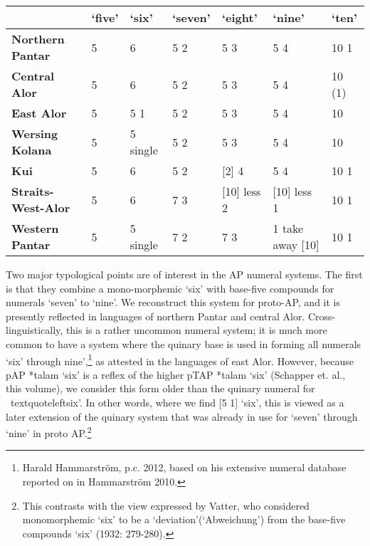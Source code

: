 \begin{center}
\tablehead{}
\begin{supertabular}{m{1.3358599in}m{0.50045985in}m{0.64905983in}m{0.62755984in}m{0.78235984in}m{1.0670599in}m{0.6406598in}}
\hline
 &
\bfseries {\textquoteleft}five{\textquoteright} &
\bfseries {\textquoteleft}six{\textquoteright} &
\bfseries {\textquoteleft}seven{\textquoteright} &
\bfseries {\textquoteleft}eight{\textquoteright} &
\bfseries {\textquoteleft}nine{\textquoteright} &
\bfseries {\textquoteleft}ten{\textquoteright}\\\hline
\bfseries Northern Pantar &
5 &
6 &
5 2 &
5 3 &
5 4 &
10 1\\
\bfseries Central Alor &
5 &
6 &
5 2  &
5 3  &
5 4  &
10 (1)\\
\bfseries East Alor  &
5 &
5 1 &
5 2  &
5 3  &
5 4  &
10\\
\bfseries Wersing Kolana &
5 &
5 single  &
5 2  &
5 3  &
5 4  &
10\\
\bfseries Kui &
5 &
6 &
5 2  &
[2] 4 &
5 4  &
10 1\\
\bfseries Straits-West-Alor &
5 &
6 &
7 3 &
[10] less 2 &
[10] less 1 &
10 1\\
\bfseries Western Pantar &
5 &
5 single  &
7 2 &
7 3 &
1 take away  [10] &
10 1\\\hline
\end{supertabular}
\end{center}
Two major typological points are of interest in the AP numeral systems. The first is that they combine a mono-morphemic {\textquoteleft}six{\textquoteright} with base-five compounds for numerals {\textquoteleft}seven{\textquoteright} to {\textquoteleft}nine{\textquoteright}. We reconstruct this system for proto-AP, and it is presently reflected in languages of northern Pantar and central Alor. Cross-linguistically, this is a rather uncommon numeral system; it is much more common to have a system where the quinary base is used in forming all numerals {\textquoteleft}six{\textquoteright} through nine{\textquoteright},\footnote{Harald Hammarstr\"om, p.c. 2012, based on his extensive numeral database reported on in Hammarstr\"om 2010.} as attested in the languages of east Alor. However, because pAP *talam {\textquoteleft}six{\textquoteright} is a reflex of the higher pTAP *talam {\textquoteleft}six{\textquoteright} (Schapper et. al., this volume), we consider this form older than the quinary numeral for {\
textquoteleft}six{\textquoteright}. In other words, where we find [5 1] {\textquoteleft}six{\textquoteright}, this is viewed as a later extension of the quinary system that was already in use for {\textquoteleft}seven{\textquoteright} through {\textquoteleft}nine{\textquoteright} in proto AP.\footnote{This contrasts with the view expressed by Vatter, who considered monomorphemic {\textquoteleft}six{\textquoteright} to be a {\textquoteleft}deviation{\textquoteright}({\textquoteleft}Abweichung{\textquoteright}) from the base-five compounds {\textquoteleft}six{\textquoteright} (1932: 279-280).}

